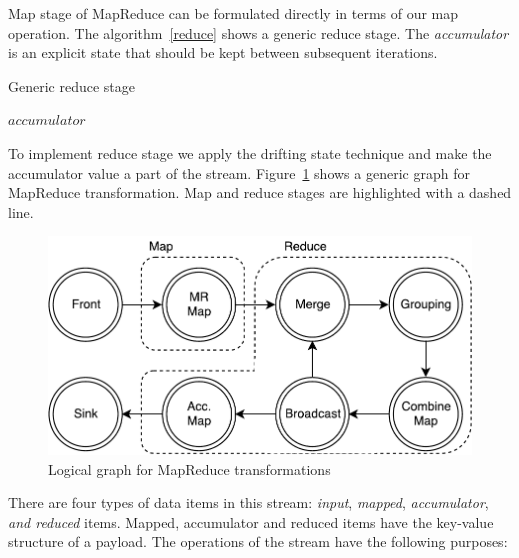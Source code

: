 
\label{fs-drifting}

Map stage of MapReduce can be formulated directly in terms of our map operation. The algorithm~\ref{reduce} shows a generic reduce stage. The {\it accumulator} is an explicit state that should be kept between subsequent iterations.

\begin{algorithm}
\caption{Generic reduce stage}
\label{reduce}
\begin{algorithmic}
    \State $accumulator$ 
      \State {}
    \EndFor
    \State \Return {}
  \EndFunction
\end{algorithmic}
\end{algorithm}

To implement reduce stage we apply the drifting state technique and make the accumulator value a part of the stream. Figure~\ref{mapreduce-graph-figure} shows a generic graph for MapReduce transformation. Map and reduce stages are highlighted with a dashed line. 

\begin{figure}[ht]
  \centering
  \includegraphics[width=.5\textwidth]{pics/mapreduce}
  \caption{Logical graph for MapReduce transformations}
  \label {mapreduce-graph-figure}
\end{figure}

There are four types of data items in this stream: {\it input}, {\it mapped}, {\it accumulator}, {\it and reduced} items. Mapped, accumulator and reduced items have the key-value structure of a payload. The operations of the stream have the following purposes:

